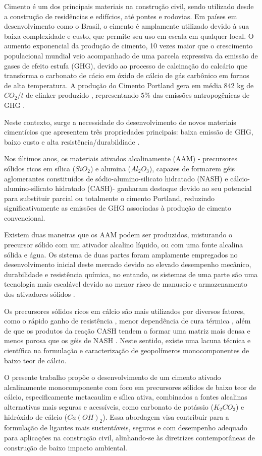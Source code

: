 Cimento é um dos principais materiais na construção civil, sendo utilizado desde a construção de residências e edifícios, até pontes e rodovias. Em países em desenvolvimento como o Brasil, o cimento é amplamente utilizado devido à sua baixa complexidade e custo, que permite seu uso em escala em qualquer local. O aumento exponencial da produção de cimento, 10 vezes maior que o crescimento populacional mundial \cite{united1995world} veio acompanhado de uma parcela expressiva da emissão de gases de efeito estufa (GHG), devido ao processo de calcinação do calcário que transforma o carbonato de cácio em óxido de cálcio de gás carbônico em fornos de alta temperatura. A produção do Cimento Portland gera em média 842 kg de $CO_2/t$ de clinker produzido \cite{andrew2018global}, representando 5\% das emissões antropogênicas de GHG \cite{IEA_WBCSD_2009}.

Neste contexto, surge a necessidade do desenvolvimento de novos materiais cimentícios que apresentem três propriedades principais: baixa emissão de GHG, baixo custo e alta resistência/durabildiade \cite{scrivener2018eco}.

Nos últimos anos, os materiais ativados alcalinamente (AAM) - precursores sólidos ricos em sílica ($SiO_2$) e alumina ($Al_2O_3$), capazes de formarem géis aglomerantes constituídos de sódio-alumino-silicato hidratado (NASH) e cálcio-alumino-silicato hidratado (CASH)- ganharam destaque devido ao seu potencial para substituir parcial ou totalmente o cimento Portland, reduzindo significativamente as emissões de GHG associadas à produção de cimento convencional.

Existem duas maneiras que os AAM podem ser produzidos, misturando o precursor sólido com um ativador alcalino líquido, ou com uma fonte alcalina sólida e água. Os sistema de duas partes foram amplamente empregados no desenvolvimento inicial deste mercado devido ao elevado desempenho mecânico, durabilidade e resistência química, no entando, os sistemas de uma parte são uma tecnologia mais escalável devido ao menor risco de manuseio e armazenamento dos ativadores sólidos \cite{provis2018alkali}.

Os precursores sólidos ricos em cálcio são mais utilizados por diversos fatores, como o rápido ganho de resistência \cite{provis2014geopolymers}, menor dependência de cura térmica \cite{ke2021one}, além de que os produtos da reação CASH tendem a formar uma matriz mais densa e menos porosa que os géis de NASH \cite{bernal2014engineering}. Neste sentido, existe uma lacuna técnica e científica na formulação e caracterização de geopolímeros monocomponentes de baixo teor de cálcio. 

O presente trabalho propõe o desenvolvimento de um cimento ativado alcalinamente monocomponente com foco em precursores sólidos de baixo teor de cálcio, especificamente metacaulim e sílica ativa, combinados a fontes alcalinas alternativas mais seguras e acessíveis, como carbonato de potássio ($K_2CO_3$) e hidróxido de cálcio ($Ca(OH)_2$). Essa abordagem visa contribuir para a formulação de ligantes mais sustentáveis, seguros e com desempenho adequado para aplicações na construção civil, alinhando-se às diretrizes contemporâneas de construção de baixo impacto ambiental.